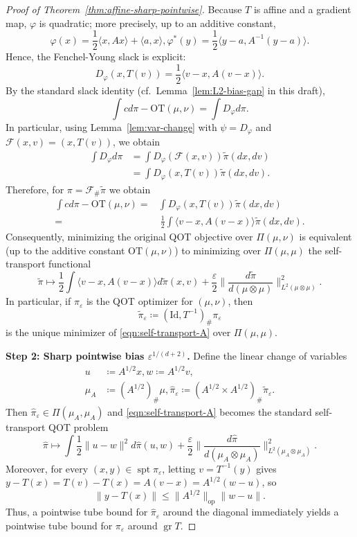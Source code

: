 \documentclass{article}
\theoremstyle{plain}
\theoremstyle{definition}
\theoremstyle{remark}
\numberwithin{equation}{section}
\DeclareMathOperator{\spt}{spt}
\DeclareMathOperator{\gr}{gr}
\newcommand{\OT}{\mathrm{OT}}
\begin{document}
\begin{proof}[Proof of Theorem~\ref{thm:affine-sharp-pointwise}]
Because $T$ is affine and a gradient map, $\varphi$ is quadratic; more precisely, up to an additive constant,
\[
\varphi(x)=\frac12\langle x,Ax\rangle+\langle a,x\rangle,\varphi^*(y)=\frac12\langle y-a,A^{-1}(y-a)\rangle.
\]
Hence, the Fenchel-Young slack is explicit:
$$
D_\varphi(x,T(v))=\frac12\langle v-x,A(v-x)\rangle.
$$
By the standard slack identity (cf.\ Lemma~\ref{lem:L2-bias-gap} in this draft),
$$
\int cd\pi-\OT(\mu,\nu)=\int D_\varphi d\pi.
$$
In particular, using Lemma~\ref{lem:var-change} with $\psi=D_\varphi$ and $\mathcal F(x,v)=(x,T(v))$, we obtain
\[
\begin{aligned}
\int D_\varphi d\pi&=\int D_\varphi(\mathcal F(x,v))\widetilde\pi(dx,dv)\\
&=\int D_\varphi(x,T(v))\widetilde\pi(dx,dv).
\end{aligned}
\]
Therefore, for $\pi=\mathcal{F}_\#\widetilde\pi$ we obtain
\[
\begin{aligned}
\int cd\pi-\OT(\mu,\nu)=&\int D_\varphi(x,T(v))\widetilde\pi(dx,dv)\\
=&\ \frac12\int\langle v-x,A(v-x)\rangle\widetilde\pi(dx,dv).
\end{aligned}
\]
Consequently, minimizing the original QOT objective over $\Pi(\mu,\nu)$ is equivalent (up to the additive constant $\OT(\mu,\nu)$) to minimizing over $\Pi(\mu,\mu)$ the self-transport functional
\begin{equation}\label{eqn:self-transport-A}
\widetilde\pi\mapsto\frac12\int\langle v-x,A(v-x)\rangle d\widetilde\pi(x,v)+\frac{\varepsilon}{2}\Big\|\frac{d\widetilde\pi}{d(\mu\otimes\mu)}\Big\|_{L^2(\mu\otimes\mu)}^2.
\end{equation}
In particular, if $\pi_\varepsilon$ is the QOT optimizer for $(\mu,\nu)$, then
$$
\widetilde\pi_\varepsilon\coloneqq(\mathrm{Id},T^{-1})_\#\pi_\varepsilon
$$
is the unique minimizer of \eqref{eqn:self-transport-A} over $\Pi(\mu,\mu)$.

\textbf{Step 2: Sharp pointwise bias $\varepsilon^{1/(d+2)}$.}
Define the linear change of variables
$$
\begin{aligned}
u&\coloneqq A^{1/2}x,w\coloneqq A^{1/2}v,\\
\mu_A&\coloneqq(A^{1/2})_\#\mu,\widehat\pi_\varepsilon\coloneqq(A^{1/2}\times A^{1/2})_\#\widetilde\pi_\varepsilon.
\end{aligned}
$$
Then $\widehat\pi_\varepsilon\in\Pi(\mu_A,\mu_A)$ and \eqref{eqn:self-transport-A} becomes the standard self-transport QOT problem
$$
\widehat\pi\mapsto\int\frac12\|u-w\|^2d\widehat\pi(u,w)+\frac{\varepsilon}{2}\Big\|\frac{d\widehat\pi}{d(\mu_A\otimes\mu_A)}\Big\|_{L^2(\mu_A\otimes\mu_A)}^2.
$$
Moreover, for every $(x,y)\in\spt\pi_\varepsilon$, letting $v=T^{-1}(y)$ gives $y-T(x)=T(v)-T(x)=A(v-x)=A^{1/2}(w-u)$, so
$$
\|y-T(x)\|\le\|A^{1/2}\|_{\mathrm{op}}\|w-u\|.
$$
Thus, a pointwise tube bound for $\widehat\pi_\varepsilon$ around the diagonal immediately yields a pointwise tube bound for $\pi_\varepsilon$ around $\gr T$.


\end{proof}
\end{document}

